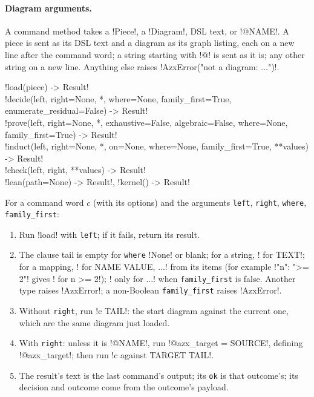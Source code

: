 \paragraph{Diagram arguments.} A command method takes a \py!Piece!, a \py!Diagram!, DSL text, or \code!@NAME!. A piece is sent as its DSL text and a diagram as its graph listing, each on a new line after the command word; a string starting with \code!@! is sent as it is; any other string on a new line. Anything else raises \code!AzxError("not a diagram: ...")!.

\begin{signature}
\py!load(piece) -> Result!\\
\py!decide(left, right=None, *, where=None, family_first=True, enumerate_residual=False) -> Result!\\
\py!prove(left, right=None, *, exhaustive=False, algebraic=False, where=None, family_first=True) -> Result!\\
\py!induct(left, right=None, *, on=None, where=None, family_first=True, **values) -> Result!\\
\py!check(left, right, **values) -> Result!\\
\py!lean(path=None) -> Result!, \py!kernel() -> Result!
\end{signature}

\begin{algorithm}\label{alg:python-api-pair}
\leavevmode
For a command word $c$ (with its options) and the arguments \texttt{left}, \texttt{right}, \texttt{where}, \texttt{family\_first}:
\begin{enumerate}
\item Run \azx!load! with \texttt{left}; if it fails, return its result.
\item The clause tail is empty for \texttt{where} \py!None! or blank; for a string, \code! for TEXT!; for a mapping, \code! for NAME VALUE, ...! from its items (for example \code!{"n": ">= 2"}! gives \code! for n >= 2!); \code! only for ...! when \texttt{family\_first} is false. Another type raises \py!AzxError!; a non-Boolean \texttt{family\_first} raises \py!AzxError!.
\item Without \texttt{right}, run \code!c TAIL!: the start diagram against the current one, which are the same diagram just loaded.
\item With \texttt{right}: unless it is \code!@NAME!, run \code!@azx_target = SOURCE!, defining \code!@azx_target!; then run \code!c against TARGET TAIL!.
\item The result's text is the last command's output; its \texttt{ok} is that outcome's; its decision and outcome come from the outcome's payload.
\end{enumerate}
\end{algorithm}

